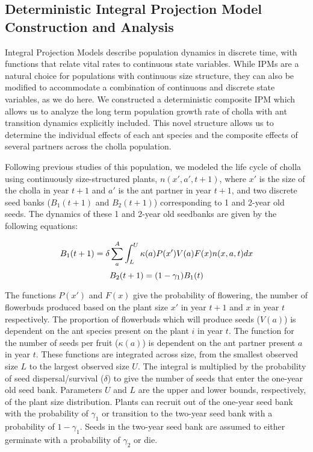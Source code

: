 \documentclass[11pt]{article}
\begin{document}
\subsection*{Deterministic Integral Projection Model Construction and Analysis}
  
Integral Projection Models describe population dynamics in discrete time, with functions that relate vital rates to continuous state variables. 
While IPMs are a natural choice for populations with continuous size structure, they can also be modified to accommodate a combination of continuous and discrete state variables, as we do here. 
We constructed a deterministic composite IPM which allows us to analyze the long term population growth rate of cholla with ant transition dynamics explicitly included.
This novel structure allows us to determine the individual effects of each ant species and the composite effects of several partners across the cholla population. 

Following previous studies of this population, we modeled the life cycle of cholla using continuously size-structured plants, $n(x',a',t+1)$, where $x'$ is the size of the cholla in year $t+1$ and $a'$ is the ant partner in year $t+1$, and two discrete seed banks ($B_{1}(t+1)$ and $B_{2}(t+1)$) corresponding to 1 and 2-year old seeds.
The dynamics of these 1 and 2-year old seedbanks are given by the following equations:

  \begin{linenomath*}
		$$
		B_1(t+1) = \delta \sum_{a}^{A} \int_L^U  \kappa(a) P(x') V(a) F(x) n(x,a,t) dx \\
		$$
		$$
		B_2(t+1) =  (1 - \gamma_1)B_1(t)\\
		$$
  \end{linenomath*}

The functions $P(x')$ and $F(x)$ give the probability of flowering, the number of flowerbuds produced based on the plant size $x'$ in year $t+1$ and $x$ in year $t$ respectively. 
The proportion of flowerbuds which will produce seeds ($V(a)$) is dependent on the ant species present on the plant $i$ in year $t$. 
The function for the number of seeds per fruit ($\kappa(a)$)  is dependent on the ant partner present $a$ in year $t$.
These functions are integrated across size, from the smallest observed size $L$ to the largest observed size $U$. %
The integral is multiplied by the probability of seed dispersal/survival ($\delta$) to give the number of seeds that enter the one-year old seed bank. 
Parameters $U$ and $L$ are the upper and lower bounds, respectively, of the plant size distribution. 
Plants can recruit out of the one-year seed bank with the probability of $\gamma_1$ or transition to the two-year seed bank with a probability of $1 - \gamma_1$. 
Seeds in the two-year seed bank are assumed to either germinate with a probability of $\gamma_2$ or die. 
		
\end{document}
